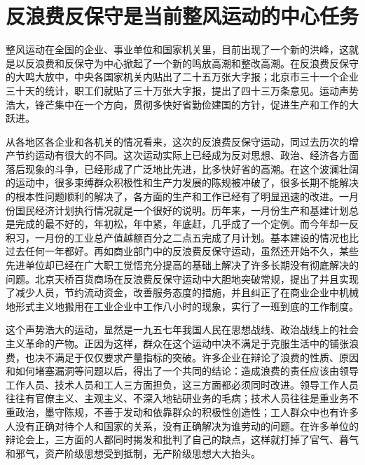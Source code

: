 \section[反浪费反保守是当前整风运动的中心任务（一九五八年二月八日）]{反浪费反保守是当前整风运动的中心任务}


整风运动在全国的企业、事业单位和国家机关里，目前出现了一个新的洪峰，这就是以反浪费和反保守为中心掀起了一个新的鸣放高潮和整改高潮。在反浪费反保守的大鸣大放中，中央各国家机关内贴出了二十五万张大字报；北京市三十一个企业三十天的统计，职工们就贴了三十万张大字报，提出了四十三万条意见。运动声势浩大，锋芒集中在一个方向，贯彻多快好省勤俭建国的方针，促进生产和工作的大跃进。

从各地区各企业和各机关的情况看来，这次的反浪费反保守运动，同过去历次的增产节约运动有很大的不同。这次运动实际上已经成为反对思想、政治、经济各方面落后现象的斗争，已经形成了广泛地比先进，比多快好省的高潮。在这个波澜壮阔的运动中，很多束缚群众积极性和生产力发展的陈规被冲破了，很多长期不能解决的根本性问题顺利的解决了，各方面的生产和工作已经有了明显迅速的改进。一月份国民经济计划执行情况就是一个很好的说明。历年来，一月份生产和基建计划总是完成的最不好的，年初松，年中紧，年底赶，几乎成了一个定例。而今年却一反积习，一月份的工业总产值越额百分之二点五完成了月计划。基本建设的情况也比过去任何一年都好。再如商业部门中的反浪费反保守运动，虽然还开始不久，某些先进单位却已经在广大职工觉悟充分提高的基础上解决了许多长期没有彻底解决的问题。北京天桥百货商场在反浪费反保守运动中大胆地突破常规，提出了并且实现了减少人员，节约流动资金，改善服务态度的措施，并且纠正了在商业企业中机械地形式主义地搬用在工业企业中工作八小时的现象，实行了一班到底的工作制度。

这个声势浩大的运动，显然是一九五七年我国人民在思想战线、政治战线上的社会主义革命的产物。正因为这样，群众在这个运动中决不满足于克服生活中的铺张浪费，也决不满足于仅仅要求产量指标的突破。许多企业在辩论了浪费的性质、原因和如何堵塞漏洞等问题以后，得出了一个共同的结论：造成浪费的责任应该由领导工作人员、技术人员和工人三方面担负，这三方面都必须同时改进。领导工作人员往往有官僚主义、主观主义、不深入地钻研业务的毛病；技术人员往往是重业务不重政治，墨守陈规，不善于发动和依靠群众的积极性创造性；工人群众中也有许多人没有正确对待个人和国家的关系，没有正确解决为谁劳动的问题。在许多单位的辩论会上，三方面的人都同时揭发和批判了自己的缺点，这样就打掉了官气、暮气和邪气，资产阶级思想受到抵制，无产阶级思想大大抬头。

